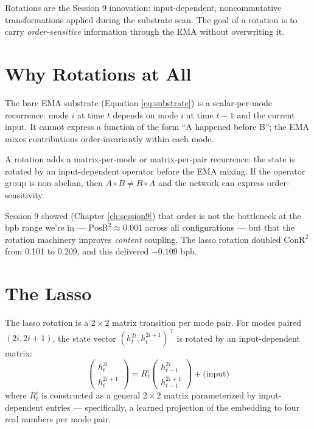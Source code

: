 \documentclass[11pt,openany]{book}
\theoremstyle{definition}
\theoremstyle{plain}
\newcommand{\conr}{\mathrm{ConR^2}}
\newcommand{\posr}{\mathrm{PosR^2}}
\begin{document}
Rotations are the Session 9 innovation: input-dependent, noncommutative
transformations applied during the substrate scan. The goal of a rotation
is to carry \emph{order-sensitive} information through the EMA without
overwriting it.

\section{Why Rotations at All}

The bare EMA substrate (Equation \ref{eq:substrate}) is a scalar-per-mode
recurrence: mode $i$ at time $t$ depends on mode $i$ at time $t-1$ and the
current input. It cannot express a function of the form ``A happened
before B''; the EMA mixes contributions order-invariantly within each
mode.

A rotation adds a matrix-per-mode or matrix-per-pair recurrence: the state
is rotated by an input-dependent operator before the EMA mixing. If the
operator group is non-abelian, then $A \circ B \neq B \circ A$ and the
network can express order-sensitivity.

Session 9 showed (Chapter \ref{ch:session9}) that order is not the
bottleneck at the bpb range we're in --- $\posr \approx 0.001$ across all
configurations --- but that the rotation machinery improves
\emph{content} coupling. The lasso rotation doubled $\conr$ from 0.101 to
0.209, and this delivered $-0.109$ bpb.

\section{The Lasso}
\label{sec:lasso}

The lasso rotation is a $2 \times 2$ matrix transition per mode pair. For
modes paired $(2i, 2i+1)$, the state vector $(h_t^{2i}, h_t^{2i+1})^\top$
is rotated by an input-dependent matrix:
\begin{equation}
  \begin{pmatrix} h_t^{2i} \\ h_t^{2i+1} \end{pmatrix}
  =
  R_t^i \begin{pmatrix} h_{t-1}^{2i} \\ h_{t-1}^{2i+1} \end{pmatrix} + \text{(input)}
\end{equation}
where $R_t^i$ is constructed as a general $2 \times 2$ matrix
parameterized by input-dependent entries --- specifically, a learned
projection of the embedding to four real numbers per mode pair.
\end{document}
